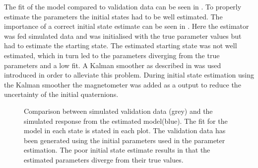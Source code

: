 The fit of the model compared to validation data can be seen in . To properly estimate the parameters the initial states had to be well estimated. The importance of a correct initial state estimate can be seen in . Here the estimator was fed simulated data and was initialised with the true parameter values but had to estimate the starting state.   The estimated starting state was not well estimated, which in turn led to the parameters diverging from the true parameters and a low fit. A Kalman smoother as described in \citet{Wallin} was used introduced in order to alleviate this problem. During initial state estimation using the Kalman smoother the magnetometer was added as a output to reduce the uncertainty of the initial quaternions.
\begin{figure}[tbp]
  \centering %
  \qquad
  \qquad
    \qquad
    \qquad
    \qquad
  \caption{\label{fig:angVelSim}%
    Comparison between simulated validation data (grey) and the simulated response from the estimated model(blue). The fit for the model in each state is stated in each plot. The validation data has been generated using the initial parameters used in the parameter estimation. The poor initial state estimate results in that the estimated parameters diverge from their true values.}
\end{figure}

